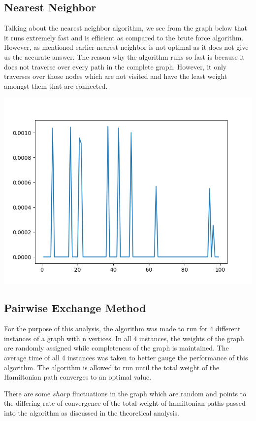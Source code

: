 \documentclass[12pt]{report}
\begin{document}
\subsection{Nearest Neighbor}
Talking about the nearest neighbor algorithm, we see from the graph below that it runs extremely fast and is efficient as compared to the brute force algorithm. However, as mentioned earlier nearest neighbor is not optimal as it does not give us the accurate answer. The reason why the algorithm runs so fast is because it does not traverse over every path in the complete graph. However, it only traverses over those nodes which are not visited and have the least weight amongst them that are connected.

\begin{center}
    \includegraphics[scale = 0.7]{images/NN1fig2.png}
\end{center}

\subsection{Pairwise Exchange Method}

For the purpose of this analysis, the algorithm was made to run for 4 different instances of a graph with n vertices. In all 4 instances, the weights of the graph are randomly assigned while completeness of the graph is maintained. The average time of all 4 instances was taken to better gauge the performance of this algorithm. The algorithm is allowed to run until the total weight of the Hamiltonian path converges to an optimal value.

There are some $sharp$ fluctuations in the graph which are random and points to the differing rate of convergence of the total weight of hamiltonian paths passed into the algorithm as discussed in the theoretical analysis. 
\end{document}
